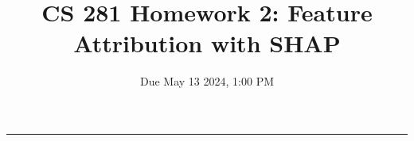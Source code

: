\documentclass{article}
\title{CS 281 Homework 2: Feature Attribution with SHAP}
\date{Due May 13 2024, 1:00 PM}
\begin{document}
\maketitle
\vspace{-0.3in}

\rule{\linewidth}{0.4pt}

%
\end{document}
